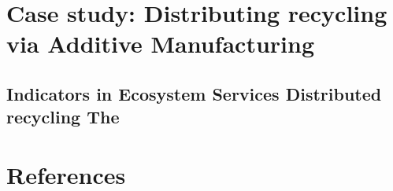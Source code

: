 \documentclass[
  14pt,
]{extarticle}
\begin{document}
\hypertarget{case-study-distributing-recycling-via-additive-manufacturing}{%
\section{Case study: Distributing recycling via Additive Manufacturing}\label{case-study-distributing-recycling-via-additive-manufacturing}}

\hypertarget{indicators-in-ecosystem-services-distributed-recycling-the}{%
\subsection{Indicators in Ecosystem Services Distributed recycling The}\label{indicators-in-ecosystem-services-distributed-recycling-the}}

\newpage

\hypertarget{references}{%
\section*{References}\label{references}}
\end{document}
